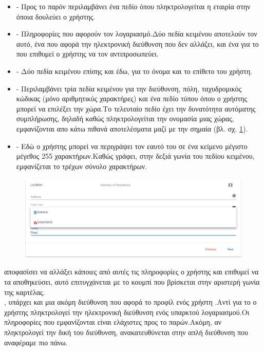 \begin{itemize}
	\item {} - Προς το παρόν περιλαμβάνει ένα πεδίο όπου πληκτρολογείται η εταιρία στην όποια δουλεύει ο χρήστης.
	\item {} - Πληροφορίες που αφορούν τον λογαριασμό.Δύο πεδία κειμένου αποτελούν τον  αυτό, ένα που αφορά την ηλεκτρονική διεύθυνση που δεν αλλάζει, και ένα για το  που επιθυμεί ο χρήστης να τον αντιπροσωπεύει.
	\item {} - Δύο πεδία κειμένου επίσης και έδω, για το όνομα και το επίθετο του χρήστη.
	\item {} - Περιλαμβάνει τρία πεδία κειμένου για την διεύθυνση, πόλη, ταχυδρομικός κώδικας (μόνο αριθμητικύς χαρακτήρες) και ένα πεδίο τύπου  όπου ο χρήστης μπορεί να επιλέξει την χώρα.Το τελευταίο πεδίο έχει την δυνατότητα αυτόματης συμπλήρωσης, δηλαδή καθώς πληκτρολογείται την ονομασία μιας χώρας, εμφανίζονται απο κάτω πιθανά αποτελέσματα μαζί με την σημαία (βλ. σχ. \ref{fig:userProfileCountry}).
	\item {} - Εδώ ο χρήστης μπορεί να περιγράψει τον εαυτό του σε ένα κείμενο μέγιστο μέγεθος 255 χαρακτήρων.Καθώς γράφει, στην δεξιά γωνία του πεδίου κειμένου, εμφανίζεται το τρέχων σύνολο χαρακτήρων.
\end{itemize}

\begin{figure}[!htb]
\includegraphics[width=\columnwidth, scale=4]{images/userProfileCountry.png}
\caption{}
\label{fig:userProfileCountry}
\end{figure}

 αποφασίσει να αλλάξει κάποιες από αυτές τις πληροφορίες ο χρήστης και επιθυμεί να τα αποθηκεύσει, αυτό επιτυγχάνεται με το κουμπί που βρίσκεται στην αριστερή γωνία της καρτέλας.\\
, υπάρχει και μια ακόμη διεύθυνση που αφορά το προφίλ ενός χρήστη .Αντί για το  ο χρήστης πληκτρολογεί την ηλεκτρονική διεύθυνση ενός υπαρκτού λογαριασμού.Οι πληροφορίες που εμφανίζονται είναι ελάχιστες προς το παρών.Ακόμη, αν πληκτρολογεί την δική του διεύθυνση, ανακατευθύνεται στην απλή διεύθυνση που αναφέραμε πιο πάνω.

